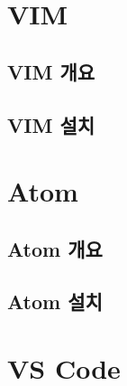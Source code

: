 \documentclass[12pt, a4paper, oneside]{book}
\let\stdsection\section
\renewcommand\section{\newpage\stdsection}
\begin{document}
	\chapter	{VIM}
	\noptcrule
	\minitoc


%										
	\section{VIM 개요}


%										
	\section{VIM 설치}



	\chapter	{Atom}
	\noptcrule
	\minitoc


%										
	\section{Atom 개요}


%										
	\section{Atom 설치}


	\chapter	{VS Code}
	\noptcrule
	\minitoc
\end{document}
